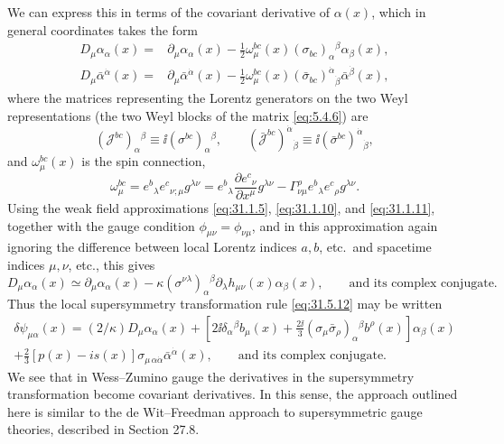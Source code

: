 We can express this in terms of the covariant derivative of \(\alpha(x)\),
which in general coordinates takes the form
\begin{equation}
  \begin{aligned}
  D_\mu\alpha_\alpha(x)
  ={}&\partial_\mu\alpha_\alpha(x)
   -\frac12\omega_\mu^{bc}(x)
      (\sigma_{bc})_\alpha{}^\beta\alpha_\beta(x),\\
  D_\mu\bar\alpha^{\dot\alpha}(x)
  ={}&\partial_\mu\bar\alpha^{\dot\alpha}(x)
   -\frac12\omega_\mu^{bc}(x)
      (\bar\sigma_{bc})^{\dot\alpha}{}_{\dot\beta}
      \bar\alpha^{\dot\beta}(x),
  \end{aligned}
  \tag{31.5.15}\label{eq:31.5.15}
\end{equation}
where the matrices representing the Lorentz generators on the two Weyl
representations (the two Weyl blocks of the matrix
\eqref{eq:5.4.6}) are
\begin{equation}
  (\mathscr J^{bc})_\alpha{}^\beta
  \equiv \ii(\sigma^{bc})_\alpha{}^\beta,
  \qquad
  (\bar{\mathscr J}^{bc})^{\dot\alpha}{}_{\dot\beta}
  \equiv \ii(\bar\sigma^{bc})^{\dot\alpha}{}_{\dot\beta},
  \tag{31.5.16}\label{eq:31.5.16}
\end{equation}
and \(\omega_\mu^{bc}(x)\) is the spin connection,
\begin{equation}
  \omega_\mu^{bc}
  =e^b{}_\lambda e^c{}_{\nu;\mu}g^{\lambda\nu}
  =e^b{}_\lambda\frac{\partial e^c{}_\nu}{\partial x^\mu}g^{\lambda\nu}
   -\Gamma^\rho_{\nu\mu}e^b{}_\lambda e^c{}_\rho g^{\lambda\nu}.
  \tag{31.5.17}\label{eq:31.5.17}
\end{equation}
Using the weak field approximations \eqref{eq:31.1.5},
\eqref{eq:31.1.10}, and \eqref{eq:31.1.11}, together with the gauge
condition \(\phi_{\mu\nu}=\phi_{\nu\mu}\), and in this approximation
again ignoring the difference between local Lorentz indices \(a,b\),
etc.\ and spacetime indices \(\mu,\nu\), etc., this gives
\begin{equation}
  D_\mu\alpha_\alpha(x)
  \simeq\partial_\mu\alpha_\alpha(x)
  -\kappa(\sigma^{\nu\lambda})_\alpha{}^\beta
    \partial_\lambda h_{\mu\nu}(x)\alpha_\beta(x),
  \qquad\text{and its complex conjugate}.
  \tag{31.5.18}\label{eq:31.5.18}
\end{equation}
Thus the local supersymmetry transformation rule \eqref{eq:31.5.12} may
be written
\begin{multline}
  \delta\psi_{\mu\alpha}(x)
  =(2/\kappa)D_\mu\alpha_\alpha(x)
  +\left[
      2\ii\delta_\alpha{}^\beta b_\mu(x)
      +\frac{2\ii}{3}
       (\sigma_\mu\bar\sigma_\rho)_\alpha{}^\beta b^\rho(x)
    \right]\alpha_\beta(x)\\
  +\frac{2}{3}[p(x)-is(x)]
    \sigma_{\mu\,\alpha\dot\alpha}\bar\alpha^{\dot\alpha}(x),
  \qquad\text{and its complex conjugate}.
  \tag{31.5.19}\label{eq:31.5.19}
\end{multline}
We see that in Wess--Zumino gauge the derivatives in the supersymmetry
transformation become covariant derivatives. In this sense, the
approach outlined here is similar to the de Wit--Freedman approach to
supersymmetric gauge theories, described in Section 27.8.

